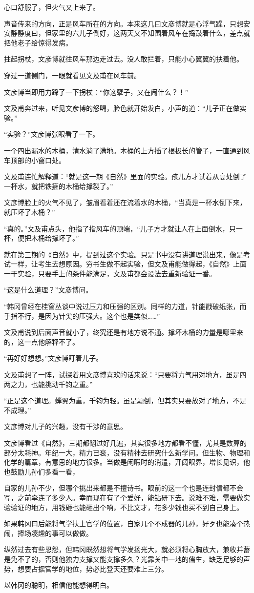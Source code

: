 心口舒服了，但火气又上来了。

声音传来的方向，正是风车所在的方向。本来这几曰文彦博就是心浮气躁，只想安安静静度曰，但家里的六儿子倒好，这两天又不知围着风车在捣鼓着什么，差点就把他老子给惊得发病。

拄起拐杖，文彦博就往风车那边走过去。没人敢拦着，只能小心翼翼的扶着他。

穿过一道侧门，一眼就看见文及甫在风车前。

文彦博当即用力跺了一下拐杖：“你这孽子，又在闹什么？！”

文及甫奔过来，听见文彦博的怒喝，脸色就开始发白，小声的道：“儿子正在做实验。”

“实验？”文彦博张眼看了一下。

一个四出漏水的木桶，清水淌了满地。木桶的上方插了根极长的管子，一直通到风车顶部的小窗口处。

文及甫连忙解释道：“就是这一期《自然》里面的实验。孩儿方才试着从高处倒了一杯水，就把铁箍的木桶给撑裂了。”

文彦博脸上的火气不见了，皱眉看着还在流着水的木桶，“当真是一杯水倒下来，就压坏了木桶？”

“真的。”文及甫点头，他指了指风车的顶端，“儿子方才就让人在上面倒水，只一杯，便把木桶给撑坏了。”

就在第三期的《自然》中，提到过这个实验。只是书中没有讲道理说出来，像是考试一样，让考生去想原因。穷书生做不起实验，但文及甫能做得起，《自然》上面一干实验，只要手上的条件能满足，文及甫都会设法去重新验证一番。

“这是什么道理？”文彦博问。

“韩冈曾经在桂窗丛谈中说过压力和压强的区别。同样的力道，针能戳破纸张，而手指不行，是因为针尖的压强大。这个也是类似……”

文及甫说到后面声音就小了，终究还是有地方说不通。撑坏木桶的力量是哪里来的，这一点他解释不了。

“再好好想想。”文彦博盯着儿子。

文及甫想了一阵，试探着用文彦博喜欢的话来说：“只要将力气用对地方，虽是四两之力，也能挑动千钧之重。”

“正是这个道理。蝉翼为重，千钧为轻。虽是颠倒，但其实只要放对了地方，不是不成理。”

文彦博对儿子的兴趣，没有干涉的意思。

文彦博看过《自然》，三期都翻过好几遍，其实很多地方都看不懂，尤其是数算的部分太耗神。年纪一大，精力已衰，没有精神去研究什么新学问。但生物、物理和化学的篇章，有意思的地方很多。当做是闲暇时的消遣，开阔眼界，增长见识，他也鼓励儿孙们多看一看，

自家的儿孙不少，但哪个挑出来都是不擅诗书。眼前的这一个也是连封信都不会写，之前牵连了多少人。幸而现在有了个爱好，能钻研下去。说难不难，需要做实验验证的地方，用钱砸也能砸出个响，不比文才，花多少钱也买不到自己身上。

如果韩冈曰后能将气学扶上官学的位置，自家几个不成器的儿孙，好歹也能凑个热闹，捧场凑趣的事可以做做。

纵然过去有些恩怨，但韩冈既然想将气学发扬光大，就必须将心胸放大，兼收并蓄是免不了的，否则他独力支撑又能支撑多久？光靠关中一地的儒生，缺乏足够的声势，想要占据官学的地位，势必比登天还要难上三分。

以韩冈的聪明，相信他能想得明白。

